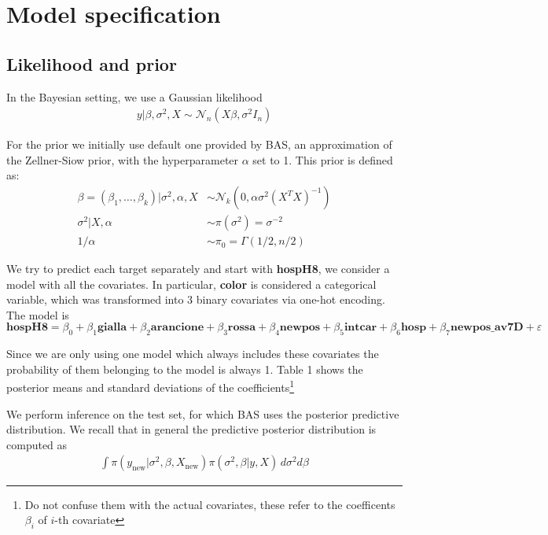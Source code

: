\documentclass[12pt,a4paper]{article}
\theoremstyle{definition}
\theoremstyle{remark}
\begin{document}
\clearpage




\section{Model specification}
\subsection{Likelihood and prior}
In the Bayesian setting, we use a Gaussian likelihood
\begin{align*}
	y|\beta,\sigma^2,X \sim \mathcal{N}_n(X\beta,\sigma^2I_n)
\end{align*}

For the prior we initially use default one provided by BAS, an approximation of the Zellner-Siow prior, with the hyperparameter $\alpha$ set to 1. This prior is defined as:
	\begin{align*}
	\beta = (\beta_1, \dots, \beta_k)|\sigma^2, \alpha, X &\sim \mathcal{N}_k(0, \alpha\sigma^2(X^TX)^{-1}) \\
	\sigma^2|X,\alpha &\sim \pi(\sigma^2) = \sigma^{-2} \\
	1/\alpha &\sim \pi_0 = \Gamma(1/2, n/2)
\end{align*}

We try to predict each target separately and start with \textbf{hospH8}, we consider a model with all the covariates. In particular, \textbf{color} is considered a categorical variable, which was transformed into 3 binary covariates via one-hot encoding. The model is
\begin{dmath*}
	\textbf{hospH8} = \beta_0 + \beta_1\textbf{gialla} + \beta_2\textbf{arancione} + \beta_3\textbf{rossa} + \beta_4\textbf{newpos} + \beta_5\textbf{intcar} + \beta_6\textbf{hosp} + \beta_7\textbf{newpos\_av7D} +  \varepsilon
\end{dmath*}

Since we are only using one model which always includes these covariates the probability of them belonging to the model is always 1.  Table 1 shows the posterior means and standard deviations of the coefficients\footnote{Do not confuse them with the actual covariates, these refer to the coefficents $\beta_i$ of $i$-th covariate}

We perform inference on the test set, for which BAS uses the posterior predictive distribution. We recall that in general the predictive posterior distribution is computed as 
	\begin{align*}
	\int \pi(y_{\text{new}}|\sigma^2,\beta,X_{\text{new}})\pi(\sigma^2,\beta|y,X)\,d\sigma^2d\beta
\end{align*}
\end{document}
